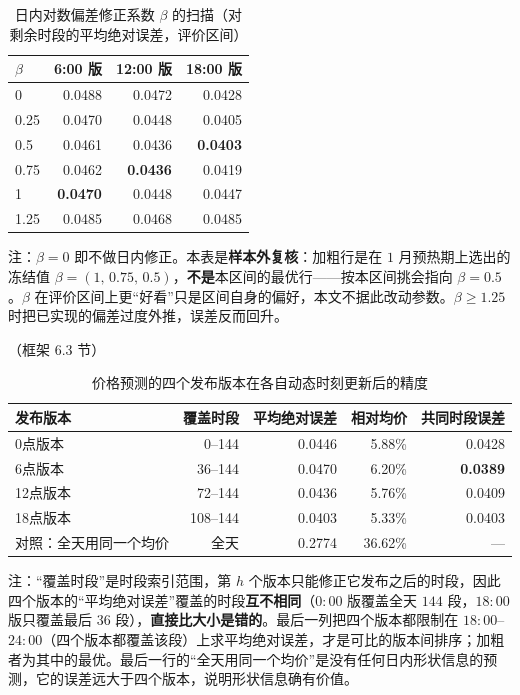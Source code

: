 \begin{table}[htbp]
  \centering
  \caption{日内对数偏差修正系数 $\beta$ 的扫描（对剩余时段的平均绝对误差，评价区间）}
  \label{tab:p4-beta}
  \footnotesize
  \begin{tabular}{lrrr}
    \toprule
    $\beta$ & 6:00 版 & 12:00 版 & 18:00 版 \\
    \midrule
    0 & 0.0488 & 0.0472 & 0.0428 \\
    0.25 & 0.0470 & 0.0448 & 0.0405 \\
    0.5 & 0.0461 & 0.0436 & \textbf{0.0403} \\
    0.75 & 0.0462 & \textbf{0.0436} & 0.0419 \\
    1 & \textbf{0.0470} & 0.0448 & 0.0447 \\
    1.25 & 0.0485 & 0.0468 & 0.0485 \\
    \bottomrule
  \end{tabular}
  \par\vspace{2pt}
  \begin{minipage}{.92\textwidth}\footnotesize
    注：$\beta=0$ 即不做日内修正。本表是\textbf{样本外复核}：加粗行是在 $1$ 月预热期上选出的冻结值 $\beta=(1,\,0.75,\,0.5)$，\textbf{不是}本区间的最优行——按本区间挑会指向 $\beta=0.5$。$\beta$ 在评价区间上更``好看''只是区间自身的偏好，本文不据此改动参数。$\beta\ge1.25$ 时把已实现的偏差过度外推，误差反而回升。
  \end{minipage}
\end{table}

\begin{table}[htbp]
  \centering
  \caption{价格预测的四个发布版本在各自动态时刻更新后的精度}（框架 6.3 节）
  \label{tab:p4-skill}
  \footnotesize
  \begin{tabular}{lrrrr}
    \toprule
    发布版本 & 覆盖时段 & 平均绝对误差 & 相对均价 & 共同时段误差 \\
    \midrule
    0点版本 & 0--144 & 0.0446 & 5.88\% & 0.0428 \\
    6点版本 & 36--144 & 0.0470 & 6.20\% & \textbf{0.0389} \\
    12点版本 & 72--144 & 0.0436 & 5.76\% & 0.0409 \\
    18点版本 & 108--144 & 0.0403 & 5.33\% & 0.0403 \\
    \midrule
    对照：全天用同一个均价 & 全天 & 0.2774 & 36.62\% & --- \\
    \bottomrule
  \end{tabular}
  \par\vspace{2pt}
  \begin{minipage}{.92\textwidth}\footnotesize
    注：``覆盖时段''是时段索引范围，第 $h$ 个版本只能修正它发布之后的时段，因此四个版本的``平均绝对误差''覆盖的时段\textbf{互不相同}（$0{:}00$ 版覆盖全天 $144$ 段，$18{:}00$ 版只覆盖最后 $36$ 段），\textbf{直接比大小是错的}。最后一列把四个版本都限制在 $18{:}00$--$24{:}00$（四个版本都覆盖该段）上求平均绝对误差，才是可比的版本间排序；加粗者为其中的最优。最后一行的``全天用同一个均价''是没有任何日内形状信息的预测，它的误差远大于四个版本，说明形状信息确有价值。
  \end{minipage}
\end{table}

